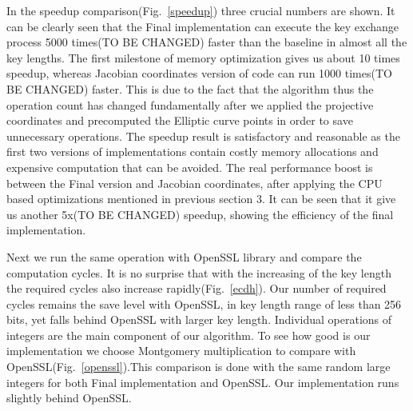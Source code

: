 In the speedup comparison(Fig.~\ref{speedup}) three crucial numbers are shown. It can be clearly seen that the Final implementation can execute the key exchange process 5000 times(TO BE CHANGED) faster than the baseline in almost all the key lengths. The first milestone of memory optimization gives us about 10 times speedup, whereas Jacobian coordinates version of code can run 1000 times(TO BE CHANGED) faster. This is due to the fact that the algorithm thus the operation count has changed fundamentally after we applied the projective coordinates and precomputed the Elliptic curve points in order to save unnecessary operations. The speedup result is satisfactory and reasonable as the first two versions of implementations contain costly memory allocations and expensive computation that can be avoided. The real performance boost is between the Final version and Jacobian coordinates, after applying the CPU based optimizations mentioned in previous section 3. It can be seen that it give us another 5x(TO BE CHANGED) speedup, showing the efficiency of the final implementation.

Next we run the same operation with OpenSSL library and compare the computation cycles. It is no surprise that with the increasing of the key length the required cycles also increase rapidly(Fig.~\ref{ecdh}). Our number of required cycles remains the save level with OpenSSL, in key length range of less than 256 bits, yet falls behind OpenSSL with larger key length. Individual operations of integers are the main component of our algorithm. To see how good is our implementation we choose Montgomery multiplication to compare with OpenSSL(Fig.~\ref{openssl}).This comparison is done with the same random large integers for both Final implementation and OpenSSL. Our implementation runs slightly behind OpenSSL. 

